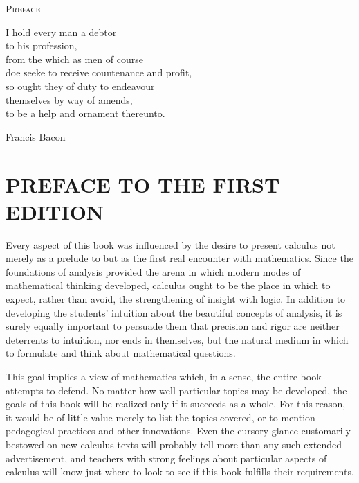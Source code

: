 %

\thispagestyle{empty}
\vspace*{3cm}
\begin{center}
  {\scshape\Huge Preface}
\end{center}
\vspace{3cm}

\epigraph{%
  I hold every man a debtor\\
  to his profession,\\
  from the which as men of course\\
  doe seeke to receive countenance and profit,\\
  so ought they of duty to endeavour\\
  themselves by way of amends,\\
  to be a help and ornament thereunto.%
}{Francis Bacon}

\section*{\mdseries PREFACE TO THE FIRST EDITION}

Every aspect of this book was influenced by the desire to present calculus not
merely as a prelude to but as the first real encounter with mathematics. Since
the foundations of analysis provided the arena in which modern modes of
mathematical thinking developed, calculus ought to be the place in which to
expect, rather than avoid, the strengthening of insight with logic. In addition
to developing the students' intuition about the beautiful concepts of analysis,
it is surely equally important to persuade them that precision and rigor are
neither deterrents to intuition, nor ends in themselves, but the natural medium
in which to formulate and think about mathematical questions.

This goal implies a view of mathematics which, in a sense, the entire book
attempts to defend. No matter how well particular topics may be developed,
the goals of this book will be realized only if it succeeds as a whole. For this
reason, it would be of little value merely to list the topics covered, or to
mention pedagogical practices and other innovations. Even the cursory glance
customarily bestowed on new calculus texts will probably tell more than any
such extended advertisement, and teachers with strong feelings about particular
aspects of calculus will know just where to look to see if this book fulfills
their requirements.

